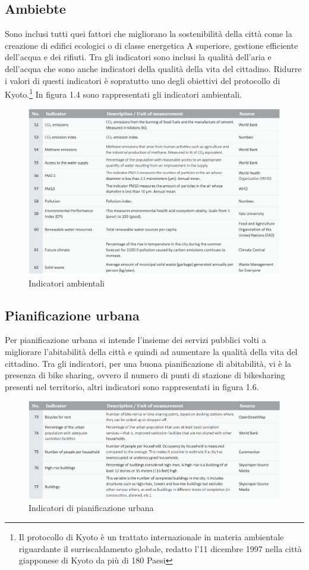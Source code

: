 \subsection{Ambiebte}
Sono inclusi tutti quei fattori che migliorano la sostenibilità della città come la creazione di edifici ecologici o di classe energetica A superiore, gestione efficiente dell'acqua e dei rifiuti. Tra gli indicatori sono inclusi la qualità dell'aria e dell'acqua che sono anche indicatori della qualità della vita del cittadino. Ridurre i valori di questi indicatori è sopratutto uno degli obiettivi del protocollo di Kyoto.\footnote{Il protocollo di Kyoto è un trattato internazionale in materia ambientale riguardante il surriscaldamento globale, redatto l'11 dicembre 1997 nella città giapponese di Kyoto da più di 180 Paesi}
In figura 1.4 sono rappresentati gli indicatori ambientali.
\begin{figure}[ht]
	\begin{center}
		\includegraphics[width=320bp]{img/indicatori_ambientale.png}
		\caption{Indicatori ambientali}
	\end{center}
\end{figure}


\subsection{Pianificazione urbana}
Per pianificazione urbana si intende l'insieme dei servizi pubblici volti a migliorare l'abitabilità della città e quindi ad aumentare la qualità della vita del cittadino. Tra gli indicatori, per una buona pianificazione di abitabilità, vi è la presenza di bike sharing, ovvero il numero di punti di stazione di bikesharing presenti nel territorio, altri indicatori sono rappresentati in figura 1.6.
\begin{figure}[ht]
	\begin{center}
		\includegraphics[width=320bp]{img/indicatori_pianificazione_urbana.png}
		\caption{Indicatori di pianificazione urbana}
	\end{center}
\end{figure}

